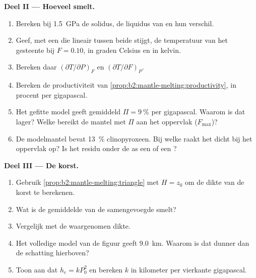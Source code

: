 \begin{problem}
\noindent\textbf{Deel II --- Hoeveel smelt.}
\begin{enumerate}[resume]
\item Bereken bij \qty{1.5}{GPa} de solidus, de liquidus van  en hun
verschil.
\item Geef, met een  die lineair tussen beide stijgt, de temperatuur van
het gesteente bij $F = 0.10$, in graden Celsius en in kelvin.
\item Bereken daar $(\partial T/\partial P)_F$ en $(\partial T/\partial F)_P$.
\item Bereken de productiviteit van \cref{prop:b2:mantle-melting:productivity}, in
procent per gigapascal.
\item Het gefitte model geeft gemiddeld $\Pi = \qty{9}{\percent}$ per gigapascal.
Waarom is dat lager? Welke  bereikt de mantel met $\Pi$ aan het
oppervlak ($F_{\max}$)?
\item De modelmantel bevat \qty{13}{\percent} clinopyroxeen. Bij welke
 raakt het dicht bij het oppervlak op? Is het residu onder de as een
 of een ?
\end{enumerate}

\noindent\textbf{Deel III --- De korst.}
\begin{enumerate}[resume]
\item Gebruik \cref{prop:b2:mantle-melting:triangle} met $H = z_0$ om de
dikte van de korst te berekenen.
\item Wat is de gemiddelde  van de samengevoegde smelt?
\item Vergelijk met de waargenomen dikte.
\item Het volledige model van de figuur geeft \qty{9.0}{km}. Waarom is dat dunner dan
de schatting hierboven?
\item Toon aan dat $h_c = k P_0^2$ en bereken $k$ in kilometer per vierkante
gigapascal.
\end{enumerate}


\end{problem}
